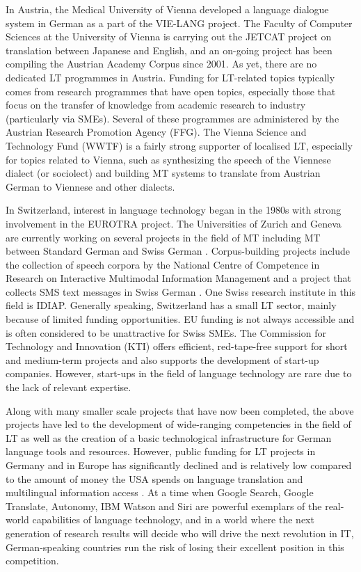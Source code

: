 \begin{multicols}{2}
In Austria, the Medical University of Vienna developed a language dialogue system in German as a part of the VIE-LANG project. The Faculty of Computer Sciences at the University of Vienna is carrying out the JETCAT project on translation between Japanese and English, and an on-going project has been compiling the Austrian Academy Corpus since 2001. As yet, there are no dedicated LT programmes in Austria. Funding for LT-related topics typically comes from research programmes that have open topics, especially those that focus on the transfer of knowledge from academic research to industry (particularly via SMEs). Several of these programmes are administered by the Austrian Research Promotion Agency (FFG). The Vienna Science and Technology Fund (WWTF) is a fairly strong supporter of localised LT, especially for topics related to Vienna, such as synthesizing the speech of the Viennese dialect (or sociolect) and building MT systems to translate from Austrian German to Viennese and other dialects.

In Switzerland, interest in language technology began in the 1980s with strong involvement in the EUROTRA project. The Universities of Zurich and Geneva are currently working on several projects in the field of MT including MT between Standard German and Swiss German \cite{latl1}. Corpus-building projects include the collection of speech corpora by the National Centre of Competence in Research on Interactive Multimodal Information Management and a project that collects SMS text messages in Swiss German \cite{sor1}. One Swiss research institute in this field is IDIAP. Generally speaking, Switzerland has a small LT sector, mainly because of limited funding opportunities. EU funding is not always accessible and is often considered to be unattractive for Swiss SMEs. The Commission for Technology and Innovation (KTI) offers efficient, red-tape-free support for short and medium-term projects and also supports the development of start-up companies. However, start-ups in the field of language technology are rare due to the lack of relevant expertise.

Along with many smaller scale projects that have now been completed, the above projects have led to the development of wide-ranging competencies in the field of LT as well as the creation of a basic technological infrastructure for German language tools and resources. However, public funding for LT projects in Germany and in Europe has significantly declined and is relatively low compared to the amount of money the USA spends on language translation and multilingual information access \cite{laz1}.
At a time when Google Search, Google Translate, Autonomy, IBM Watson and
Siri are powerful exemplars of the real-world capabilities of language technology, and in a world where the next generation of research results will decide who will drive the next revolution in IT, German-speaking countries run the risk of losing their excellent position in this competition.


\end{multicols}

